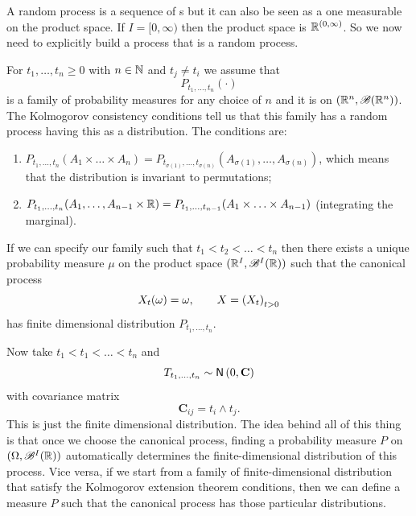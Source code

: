 \documentclass[12pt]{report}
\begin{document}
A random process is a sequence of \rv s but it can also be seen as a one \rv{} measurable on the product space. If $I=[0,\infty)$ then the product space is $\mathbb{R}^{(0,\infty)}$. So we now need to explicitly build a process that is a random process.
\begin{theorem}
	For $t_{1},\ldots,t_{n}\geq0$ with $n\in\mathbb{N}$ and $t_{j}\neq t_{i}$ we assume that 
	\begin{equation*}
		P_{t_{1},\ldots,t_{n}}(\cdot)
	\end{equation*}
	is a family of probability measures for any choice of $n$ and it is on $\left(\mathbb{R}^{n},\mathscr{B}(\mathbb{R}^{n})\right)$.
The Kolmogorov consistency conditions tell us that this family has a random process having this as a distribution. The conditions are:
\begin{enumerate}
	\item $P_{t_{1},\ldots,t_{n}}(A_{1}\times\ldots\times A_{n})=P_{t_{\sigma(1)},\ldots,t_{\sigma(n)}}(A_{\sigma(1)},\ldots,A_{\sigma(n)})$, which means that the distribution is invariant to permutations;
	\item $P_{t_{1},\ldots,t_{n}}(A_{1},\ldots,A_{n-1}\times \mathbb{R})=P_{t_{1},\ldots,t_{n-1}}(A_{1}\times\ldots\times A_{n-1})$ (integrating the marginal).
\end{enumerate}
If we can specify our family such that $t_{1}<t_{2}<\ldots<t_{n}$ then there exists a unique probability measure $\mu$ on the product space $(\mathbb{R}^{I},\mathscr{B}^{I}(\mathbb{R}))$ such that the canonical process
\begin{equation*}
	X_{t}(\omega)=\omega,\qquad X={\left({X}_{t}\right)}_{t>0}
\end{equation*}
has finite dimensional distribution $P_{t_{1},\ldots,t_{n}}$. 
\end{theorem}
Now take $t_{1}<t_{1}<\ldots<t_{n}$ and 
\begin{equation*}
	T_{t_{1},\ldots,t_{n}}\sim\mathsf{N}\left(0,\mathbf{C}\right)
\end{equation*}
with covariance matrix
\begin{equation*}
	\mathbf{C}_{ij}=t_{i}\wedge t_{j}.
\end{equation*}
This is just the finite dimensional \bwm{} distribution. The idea behind all of this thing is that once we choose the canonical process, finding a probability measure $P$ on $(\Omega,\mathscr{B}^{I}(\mathbb{R}))$ automatically determines the finite-dimensional distribution of this process. Vice versa, if we start from a family of finite-dimensional distribution that satisfy the Kolmogorov extension theorem conditions, then we can define a measure $P$ such that the canonical process has those particular distributions.
\end{document}
